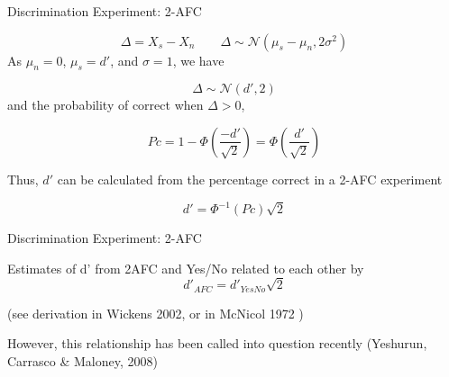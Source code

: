 \documentclass[10pt]{beamer}
\begin{document}
\begin{frame}{Discrimination Experiment: 2-AFC}

$$
\Delta = X_s - X_n \quad \quad \Delta \sim \mathcal{N} (\mu_s - \mu_n, 2\sigma^2)
$$
As $\mu_n=0$, $\mu_s=d'$, and $\sigma=1$, we have

$$
\Delta \sim \mathcal{N} (d', 2)
$$
and the probability of correct  when $\Delta > 0$,

$$Pc = 1 -\Phi\left(\frac{-d'}{\sqrt{2}}\right) = \Phi\left(\frac{d'}{\sqrt{2}} \right)
$$

Thus, $d'$ can be calculated from the percentage correct in a 2-AFC experiment

\begin{equation}
\label{eq:dp_2afc}
d' = \Phi^{-1}(Pc) \sqrt{2}
\end{equation}

\end{frame}

\begin{frame}{Discrimination Experiment: 2-AFC}

Estimates of d' from 2AFC and Yes/No related to each other by 
$$
d'_{AFC} =  d'_{YesNo} \sqrt{2}
$$ 

(see derivation in Wickens 2002,  or in McNicol 1972 )\\
\vspace{10pt}

However, this relationship has been called into question recently (Yeshurun, Carrasco \& Maloney, 2008)
\end{frame}
\end{document}
